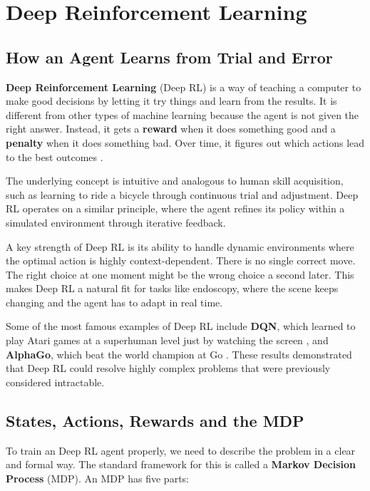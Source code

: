 \clearpage
\section{Deep Reinforcement Learning}
\label{sec:reinforcement_learning}

\subsection{How an Agent Learns from Trial and Error}

\textbf{Deep Reinforcement Learning} (Deep RL) is a way of teaching a computer to make good decisions by letting it try things and learn from the results. It is different from other types of machine learning because the agent is not given the right answer. Instead, it gets a \textbf{reward} when it does something good and a \textbf{penalty} when it does something bad. Over time, it figures out which actions lead to the best outcomes \cite{sutton2018reinforcement}.

The underlying concept is intuitive and analogous to human skill acquisition, such as learning to ride a bicycle through continuous trial and adjustment. Deep RL operates on a similar principle, where the agent refines its policy within a simulated environment through iterative feedback.

A key strength of Deep RL is its ability to handle dynamic environments where the optimal action is highly context-dependent. There is no single correct move. The right choice at one moment might be the wrong choice a second later. This makes Deep RL a natural fit for tasks like endoscopy, where the scene keeps changing and the agent has to adapt in real time.

Some of the most famous examples of Deep RL include \textbf{DQN}, which learned to play Atari games at a superhuman level just by watching the screen \cite{mnih2015dqn}, and \textbf{AlphaGo}, which beat the world champion at Go \cite{silver2016alphago}. These results demonstrated that Deep RL could resolve highly complex problems that were previously considered intractable.


\subsection{States, Actions, Rewards and the MDP}

To train an Deep RL agent properly, we need to describe the problem in a clear and formal way. The standard framework for this is called a \textbf{Markov Decision Process} (MDP). An MDP has five parts:

